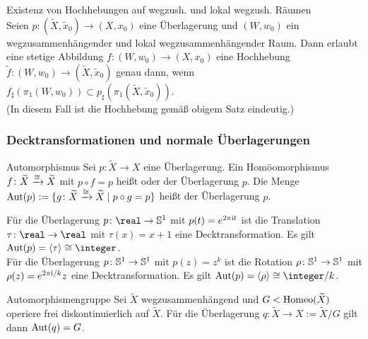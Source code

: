 \begin{Satz}{Existenz von Hochhebungen auf wegzush.
             und lokal wegzush. Räumen}\\
    Seien $p\colon (\widetilde{X}, \widetilde{x}_0) \rightarrow (X, x_0)$
    eine Überlagerung und $(W, w_0)$ ein wegzusammenhängender und lokal
    wegzusammenhängender Raum.
    Dann erlaubt eine stetige Abbildung $f\colon (W, w_0) \rightarrow (X, x_0)$
    eine Hochhebung $\widetilde{f}\colon (W, w_0) \rightarrow
    (\widetilde{X}, \widetilde{x}_0)$ genau dann, wenn
    $f_\sharp(\pi_1(W, w_0)) \subset
    p_\sharp(\pi_1(\widetilde{X}, \widetilde{x}_0))$. \\
    (In diesem Fall ist die Hochhebung gemäß obigem Satz eindeutig.)
\end{Satz}

\subsubsection{%
    Decktransformationen und normale Überlagerungen%
}

\begin{Def}{Automorphismus}
    Sei $p\colon \widetilde{X} \rightarrow X$ eine Überlagerung.
    Ein Homöomorphismus $f\colon \widetilde{X} \xrightarrow{\cong} \widetilde{X}$ mit
    $p \circ f = p$ heißt  oder
     der Überlagerung $p$.
    Die Menge $\text{Aut}(p) := \{g\colon \widetilde{X} \xrightarrow{\cong} \widetilde{X} \;|\;
    p \circ g = p\}$ heißt  der Überlagerung $p$.
\end{Def}

\begin{Bsp}
    Für die Überlagerung $p\colon \real \rightarrow \sphere^1$ mit
    $p(t) = e^{2\pi\mathrm{i} t}$ ist die Translation
    $\tau\colon \real \rightarrow \real$ mit
    $\tau(x) = x + 1$ eine Decktransformation.
    Es gilt $\Aut(p) = \aufspann{\tau} \cong \integer$. \\
    Für die Überlagerung $p\colon \mathbb{S}^1 \rightarrow \mathbb{S}^1$ mit
    $p(z) = z^k$ ist die Rotation
    $\rho\colon \mathbb{S}^1 \rightarrow \mathbb{S}^1$ mit
    $\rho(z) = e^{2\pi\mathrm{i}/k} z$ eine Decktransformation.
    Es gilt $\Aut(p) = \aufspann{\rho} \cong \integer/k$.
\end{Bsp}

\begin{Satz}{Automorphismengruppe}
    Sei $\widetilde{X}$ wegzusammenhängend und $G < \text{Homeo}(\widetilde{X})$
    operiere frei diskontinuierlich auf $\widetilde{X}$.
    Für die Überlagerung
    $q\colon \widetilde{X} \rightarrow X := \widetilde{X}/G$ gilt dann
    $\text{Aut}(q) = G$.
\end{Satz}

